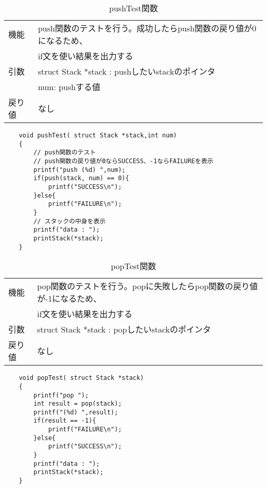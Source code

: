 \documentclass[dvipdfmx]{jsarticle}
\begin{document}
\begin{table}[ht]
  \centering
  \begin{tabular}{|p{5cm}|p{10cm}|}
    \hline
    機能  & push関数のテストを行う。成功したらpush関数の戻り値が0になるため、   \\ &if文を使い結果を出力する           \\
    \hline
    引数  & struct Stack *stack : pushしたいstackのポインタ \\
        & num: pushする値                            \\
    \hline
    戻り値 & なし                                      \\
  \end{tabular}
  \begin{lstlisting}
    void pushTest( struct Stack *stack,int num)
    {
        // push関数のテスト
        // push関数の戻り値が0ならSUCCESS、-1ならFAILUREを表示
        printf("push (%d) ",num);
        if(push(stack, num) == 0){
            printf("SUCCESS\n");
        }else{
            printf("FAILURE\n");
        }
        // スタックの中身を表示
        printf("data : ");
        printStack(*stack);
    }
  \end{lstlisting}
  \caption{pushTest関数}
  \label{tab:pushtest_func}
\end{table}
\begin{table}[ht]
  \centering
  \begin{tabular}{|p{5cm}|p{10cm}|}
    \hline
    機能  & pop関数のテストを行う。popに失敗したらpop関数の戻り値が-1になるため、 \\ & if文を使い結果を出力する            \\
    \hline
    引数  & struct Stack *stack : popしたいstackのポインタ   \\
    \hline
    戻り値 & なし                                       \\
  \end{tabular}
  \begin{lstlisting}
    void popTest( struct Stack *stack)
    {
        printf("pop ");
        int result = pop(stack);
        printf("(%d) ",result);
        if(result == -1){
            printf("FAILURE\n");
        }else{
            printf("SUCCESS\n");
        }
        printf("data : ");
        printStack(*stack);
    }
  \end{lstlisting}
  \caption{popTest関数}
  \label{tab:poptest_func}
\end{table}
\newpage
\clearpage
\end{document}
